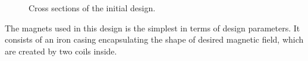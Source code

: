 \documentclass[a4paper,oneside,12pt]{report}
\numberwithin{equation}{chapter}
\begin{document}
\vspace{20pt}
\begin{figure}[H]
    \centering
    \qquad{}%
    \vspace{0pt}
    \caption{\centering Cross sections of the initial design.} 
    \label{fig:initial_design_cross_section}
    \vspace{-12pt}
\end{figure}
The magnets used in this design is the simplest in terms of design parameters. It consists of an iron casing encapsulating the shape of desired magnetic field, which are created by two coils inside.
\end{document}
